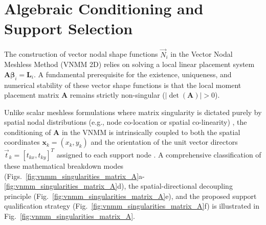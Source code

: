 \documentclass[preprint,12pt]{elsarticle}
\begin{document}
\section{Algebraic Conditioning and Support Selection}
\label{sec:conditioning}

The construction of vector nodal shape functions $\vec{N}_i$ in the Vector Nodal Meshless Method (VNMM 2D) \cite{ortiz2021nodal, ortiz2023tese} relies on solving a local linear placement system $\mathbf{A} \boldsymbol{\beta}_i = \mathbf{L}_i$. A fundamental prerequisite for the existence, uniqueness, and numerical stability of these vector shape functions is that the local moment placement matrix $\mathbf{A}$ remains strictly non-singular ($|\det(\mathbf{A})| > 0$).

Unlike scalar meshless formulations where matrix singularity is dictated purely by spatial nodal distributions (e.g., node co-location or spatial co-linearity) \cite{lima2017edge}, the conditioning of $\mathbf{A}$ in the VNMM is intrinsically coupled to both the spatial coordinates $\mathbf{x}_k = (x_k, y_k)$ and the orientation of the unit vector directors $\vec{t}_k = [t_{kx}, t_{ky}]^T$ assigned to each support node \cite{ortiz2021nodal, goncalves2025tese}. A comprehensive classification of these mathematical breakdown modes (Figs.~\ref{fig:vnmm_singularities_matrix_A}a-\ref{fig:vnmm_singularities_matrix_A}d), the spatial-directional decoupling principle (Fig.~\ref{fig:vnmm_singularities_matrix_A}e), and the proposed support qualification strategy (Fig.~\ref{fig:vnmm_singularities_matrix_A}f) is illustrated in Fig.~\ref{fig:vnmm_singularities_matrix_A}.
\end{document}

